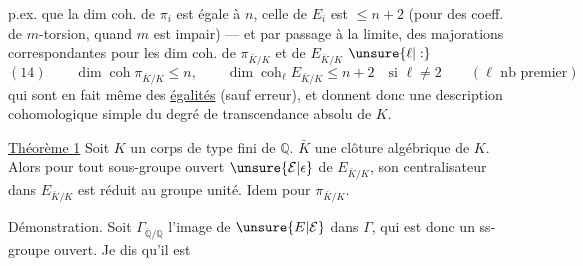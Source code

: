p.ex. que la dim coh. de $\pi_i$ est égale à $n$, celle de $E_i$ est $\leq n+2$ (pour des coeff.  de $m$-torsion, quand $m$ est impair) --- et par passage à la limite, des majorations correspondantes pour les dim coh. de $\pi_{\bar K/K}$ et de $E_{\bar K/K}$ $\unsure{\ell|:}$
\[
(14)\qquad \dim\operatorname{coh}\pi_{\bar K/K}\leq n,\qquad
\dim\operatorname{coh}_{\ell}E_{\bar K/K}\leq n+2\quad\text{si }\ell\neq2
\qquad(\ell\text{ nb premier})
\]
qui sont en fait même des \uline{égalités} (sauf erreur), et donnent donc une description cohomologique simple du degré de transcendance absolu de $K$.

\uline{Théorème 1} Soit $K$ un corps  de type fini de $\mathbb Q$.  $\bar K$ une clôture algébrique de $K$. Alors pour tout sous-groupe ouvert $\unsure{\mathcal E|\epsilon}$ de $E_{\bar K/K}$, son centralisateur dans $E_{\bar K/K}$ est réduit au groupe unité. Idem pour $\pi_{\bar K/K}$.

Démonstration. Soit $\Gamma_{\overline{\mathbb Q}/\mathbb Q}$ l'image de $\unsure{E|\mathcal E}$ dans $\Gamma$, qui est donc un ss-groupe ouvert.   Je dis qu'il est
